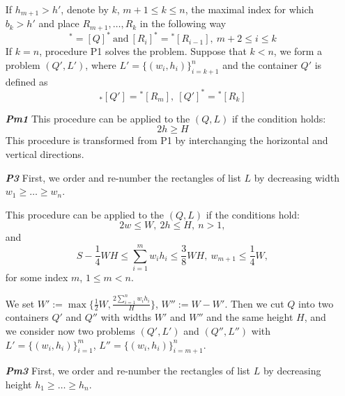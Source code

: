 \documentclass{article}
\theoremstyle{definition}
\theoremstyle{theorem}
\numberwithin{proposition}{section}
\begin{document}
\begin{enumerate}
            If $h_{m+1} >h'$, denote by $k$, $m+1\leq k\leq n$, the maximal index for which $b_k>h'$ and place $R_{m+1},\dots,R_k$ in the following way
            \begin{equation*}
                [R_1]^{*} =[Q]^{*}~\text{and}~[R_i]^{*}={}^{*}[R_{i-1}],~m+2\leq i\leq k
            \end{equation*}
            If $k=n$, procedure P1 solves the problem. Suppose that $k < n$, we form a problem $(Q', L')$, where $L' = \{(w_i, h_i)\}_{i=k+1}^{n}$ and the container $Q'$ is defined as
            \begin{equation*}
                {}_{*}[Q'] = {}^{*}[R_m],~[Q']^{*} = {}^{*}[R_k] 
            \end{equation*}
        \item[\textbf{\textit{Pm1}}]
            This procedure can be applied to the $(Q, L)$ if the condition holds: 
            \begin{equation*}
                2h \geq H
            \end{equation*}
            This procedure is transformed from P1 by interchanging the horizontal and vertical directions.
        \item[\textbf{\textit{P3}}]
            First, we order and re-number the rectangles of list $L$ by decreasing width $w_1 \geq\dots\geq  w_n$.

            This procedure can be applied to the $(Q, L)$ if the conditions hold: 
            \begin{equation*}
                2w\leq W,~2h\leq H,~n>1,
            \end{equation*}
            and
            \begin{equation*}
                S-\frac{1}{4}WH\leq \sum_{i=1}^{m}w_ih_i \leq \frac{3}{8}WH,~w_{m+1}\leq\frac{1}{4}W,
            \end{equation*}
            for some index $m$, $1 \leq m < n$.

            We set $W' := \max\{\frac{1}{2}W, \frac{2\sum_{i=1}^{n}w_ih_i}{H}\}$, $W'' := W - W'$. Then we cut $Q$ into two containers $Q'$ and $Q''$ with widths $W'$ and $W''$ and the same height $H$, and we consider now two problems $(Q', L')$ and $(Q'', L'')$ with $L' = \{(w_i, h_i)\}_{i=1}^{m}$, $L'' = \{(w_i, h_i)\}_{i=m+1}^{n}$.
        \item[\textbf{\textit{Pm3}}]
            First, we order and re-number the rectangles of list $L$ by decreasing height $h_1 \geq\dots\geq h_n$. 


\end{enumerate}
\end{document}
